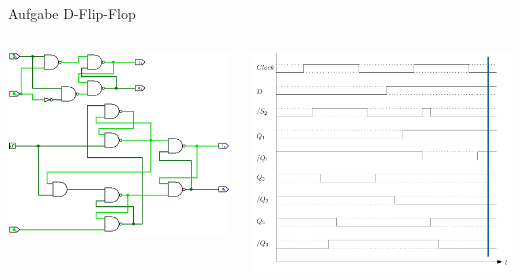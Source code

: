 \begin{frame}{Aufgabe \thesection}{D-Flip-Flop}
  \begin{solutionnoinc}
    \begin{columns}
      \begin{column}{0.5\textwidth}
        \includegraphics[height=0.5\paperheight, center]{./figures/comparison011.png}
      \end{column}
      \begin{column}{0.5\textwidth}
        \includegraphics[height=0.5\paperheight, center]{./figures/timing_diagram_6.png}
      \end{column}
    \end{columns}
  \end{solutionnoinc}
\end{frame}
